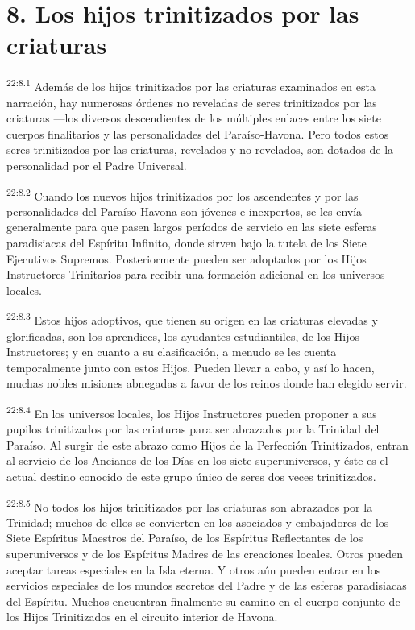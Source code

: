 \section*{8. Los hijos trinitizados por las criaturas}
\par
\textsuperscript{22:8.1} Además de los hijos trinitizados por las criaturas examinados en esta narración, hay numerosas órdenes no reveladas de seres trinitizados por las criaturas ---los diversos descendientes de los múltiples enlaces entre los siete cuerpos finalitarios y las personalidades del Paraíso-Havona. Pero todos estos seres trinitizados por las criaturas, revelados y no revelados, son dotados de la personalidad por el Padre Universal.

\par
\textsuperscript{22:8.2} Cuando los nuevos hijos trinitizados por los ascendentes y por las personalidades del Paraíso-Havona son jóvenes e inexpertos, se les envía generalmente para que pasen largos períodos de servicio en las siete esferas paradisiacas del Espíritu Infinito, donde sirven bajo la tutela de los Siete Ejecutivos Supremos. Posteriormente pueden ser adoptados por los Hijos Instructores Trinitarios para recibir una formación adicional en los universos locales.

\par
\textsuperscript{22:8.3} Estos hijos adoptivos, que tienen su origen en las criaturas elevadas y glorificadas, son los aprendices, los ayudantes estudiantiles, de los Hijos Instructores; y en cuanto a su clasificación, a menudo se les cuenta temporalmente junto con estos Hijos. Pueden llevar a cabo, y así lo hacen, muchas nobles misiones abnegadas a favor de los reinos donde han elegido servir.

\par
\textsuperscript{22:8.4} En los universos locales, los Hijos Instructores pueden proponer a sus pupilos trinitizados por las criaturas para ser abrazados por la Trinidad del Paraíso. Al surgir de este abrazo como Hijos de la Perfección Trinitizados, entran al servicio de los Ancianos de los Días en los siete superuniversos, y éste es el actual destino conocido de este grupo único de seres dos veces trinitizados.

\par
\textsuperscript{22:8.5} No todos los hijos trinitizados por las criaturas son abrazados por la Trinidad; muchos de ellos se convierten en los asociados y embajadores de los Siete Espíritus Maestros del Paraíso, de los Espíritus Reflectantes de los superuniversos y de los Espíritus Madres de las creaciones locales. Otros pueden aceptar tareas especiales en la Isla eterna. Y otros aún pueden entrar en los servicios especiales de los mundos secretos del Padre y de las esferas paradisiacas del Espíritu. Muchos encuentran finalmente su camino en el cuerpo conjunto de los Hijos Trinitizados en el circuito interior de Havona.

